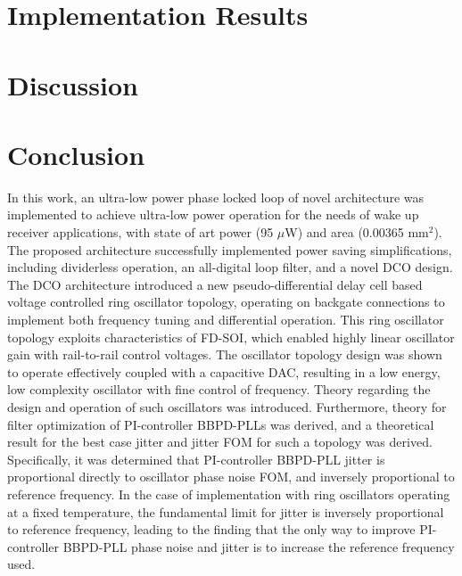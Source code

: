 	\FloatBarrier\pagebreak
	\section{Implementation Results}\label{results}
	

	\FloatBarrier\pagebreak
	\section{Discussion}\label{disco}
    

    \FloatBarrier

    \pagebreak
    \section{Conclusion} \label{conclusion}

    In this work, an ultra-low power phase locked loop of novel architecture was implemented to achieve ultra-low power operation for the needs of wake up receiver applications, with state of art power (95 $\mu$W) and area (0.00365 mm$^2$). The proposed architecture successfully implemented power saving simplifications, including dividerless operation, an all-digital loop filter, and a novel DCO design. The DCO architecture introduced a new pseudo-differential delay cell based voltage controlled ring oscillator topology, operating on backgate connections to implement both frequency tuning and differential operation. This ring oscillator topology exploits characteristics of FD-SOI, which enabled highly linear oscillator gain with rail-to-rail control voltages. The oscillator topology design was shown to operate effectively coupled with a capacitive DAC, resulting in a low energy, low complexity oscillator with fine control of frequency. Theory regarding the design and operation of such oscillators was introduced. Furthermore, theory for filter optimization of PI-controller BBPD-PLLs was derived, and a theoretical result for the best case jitter and jitter FOM for such a topology was derived. Specifically, it was determined that PI-controller BBPD-PLL jitter is proportional directly to oscillator phase noise FOM, and inversely proportional to reference frequency. In the case of implementation with ring oscillators operating at a fixed temperature, the fundamental limit for jitter is inversely proportional to reference frequency, leading to the finding that the only way to improve PI-controller BBPD-PLL phase noise and jitter is to increase the reference frequency used.

    \pagebreak
	\printbibliography


	\pagebreak
	


